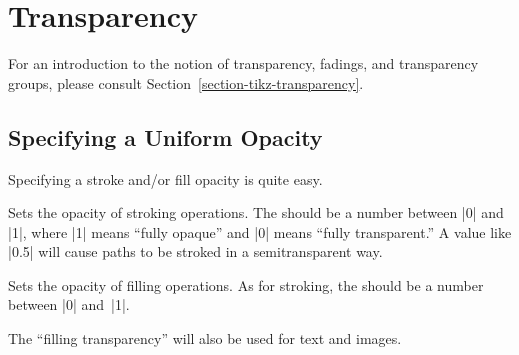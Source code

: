 %
%
%


\section{Transparency}

\label{section-transparency}


For an introduction to the notion of transparency, fadings, and
transparency groups, please consult Section~\ref{section-tikz-transparency}. 


\subsection{Specifying a Uniform Opacity}

Specifying a stroke and/or fill opacity is quite easy.

\begin{command}{\pgfsetstrokeopacity{}}
  Sets the opacity of stroking operations. The  should be
  a number between |0| and |1|, where |1| means ``fully opaque'' and
  |0| means ``fully transparent.'' A value like |0.5| will cause paths
  to be stroked in a semitransparent way.
  
\begin{codeexample}[]
\begin{pgfpicture}
  \pgfsetlinewidth{5mm}
  \color{red}
  \pgfpathcircle{\pgfpoint{0cm}{0cm}}{10mm} 
  \color{black}
  \pgfpathcircle{\pgfpoint{1cm}{0cm}}{10mm} 
\end{pgfpicture}
\end{codeexample}
\end{command}


\begin{command}{\pgfsetfillopacity{}}
  Sets the opacity of filling operations. As for stroking, the
   should be a number between |0| and~|1|.

  The ``filling transparency'' will also be used for text and images.  
  
\begin{codeexample}[]
\end{codeexample}
\end{command}


